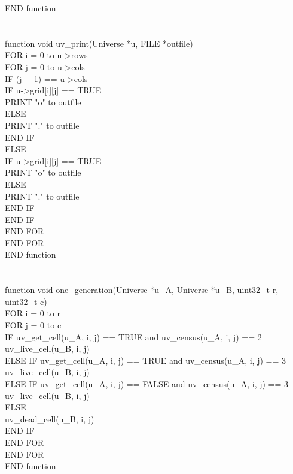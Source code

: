 \documentclass[12pt]{article}
\begin{document}
END function \\
\\
\\
function void uv\_print(Universe *u, FILE *outfile) \\
\indent FOR i = 0 to u->rows \\
\indent \indent FOR j = 0 to u->cols \\
\indent \indent \indent IF (j + 1) == u->cols \\
\indent \indent \indent \indent IF u->grid[i][j] == TRUE \\
\indent \indent \indent \indent \indent PRINT "o\n" to outfile \\
\indent \indent \indent \indent ELSE \\
\indent \indent \indent \indent \indent PRINT ".\n" to outfile \\
\indent \indent \indent \indent END IF \\
\indent \indent \indent ELSE \\
\indent \indent \indent \indent IF u->grid[i][j] == TRUE \\
\indent \indent \indent \indent \indent PRINT "o" to outfile \\
\indent \indent \indent \indent ELSE \\
\indent \indent \indent \indent \indent PRINT "." to outfile \\
\indent \indent \indent \indent END IF \\
\indent \indent \indent END IF \\
\indent \indent END FOR \\
\indent END FOR \\
END function \\
\\
\\
function void one\_generation(Universe *u\_A, Universe *u\_B, uint32\_t r, uint32\_t c) \\
\indent FOR i = 0 to r \\
\indent \indent FOR j = 0 to c \\
\indent \indent \indent IF uv\_get\_cell(u\_A, i, j) == TRUE and uv\_census(u\_A, i, j) == 2 \\
\indent \indent \indent \indent uv\_live\_cell(u\_B, i, j) \\
\indent \indent \indent ELSE IF uv\_get\_cell(u\_A, i, j) == TRUE and uv\_census(u\_A, i, j) == 3 \\
\indent \indent \indent \indent uv\_live\_cell(u\_B, i, j) \\
\indent \indent \indent ELSE IF uv\_get\_cell(u\_A, i, j) == FALSE and uv\_census(u\_A, i, j) == 3 \\
\indent \indent \indent \indent uv\_live\_cell(u\_B, i, j) \\
\indent \indent \indent ELSE \\
\indent \indent \indent \indent uv\_dead\_cell(u\_B, i, j) \\
\indent \indent \indent END IF \\
\indent \indent END FOR \\
\indent END FOR \\
END function \\
\\
\\
\end{document}
